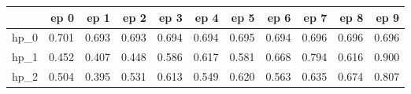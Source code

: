 \begin{tabular}{lrrrrrrrrrr}
\toprule
{} &   ep 0 &   ep 1 &   ep 2 &   ep 3 &   ep 4 &   ep 5 &   ep 6 &   ep 7 &   ep 8 &   ep 9 \\
\midrule
hp\_0 &  0.701 &  0.693 &  0.693 &  0.694 &  0.694 &  0.695 &  0.694 &  0.696 &  0.696 &  0.696 \\
hp\_1 &  0.452 &  0.407 &  0.448 &  0.586 &  0.617 &  0.581 &  0.668 &  0.794 &  0.616 &  0.900 \\
hp\_2 &  0.504 &  0.395 &  0.531 &  0.613 &  0.549 &  0.620 &  0.563 &  0.635 &  0.674 &  0.807 \\
\bottomrule
\end{tabular}
